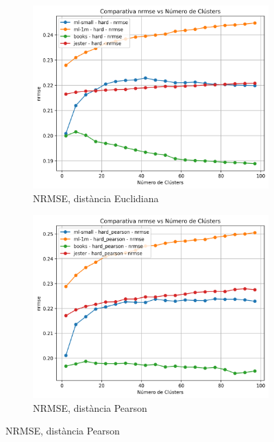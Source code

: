 \documentclass[a4paper,12pt]{report}
\begin{document}
\begin{figure}[H]
    \vspace{1em}

    \begin{subfigure}[b]{0.49\textwidth}
        \includegraphics[width=\textwidth]{Figuras/nrmse-hard-all.png}
        \caption{NRMSE, distància Euclidiana}
        \label{fig:hard-clustering-results-c}
    \end{subfigure}
    \hfill
    \begin{subfigure}[b]{0.49\textwidth}
        \includegraphics[width=\textwidth]{Figuras/nrmse-hard_pearson-all.png}
        \caption{NRMSE, distància Pearson}
        \label{fig:hard-clustering-results-d}
    \end{subfigure}


\end{figure}
\end{document}

